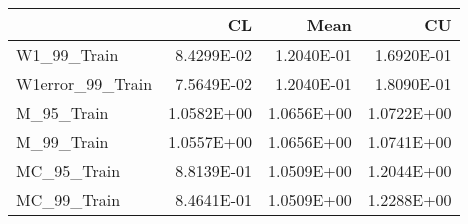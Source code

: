 \begin{tabular}{lrrr}
\toprule
{} &         CL &       Mean &         CU \\
\midrule
W1\_99\_Train      & 8.4299E-02 & 1.2040E-01 & 1.6920E-01 \\
W1error\_99\_Train & 7.5649E-02 & 1.2040E-01 & 1.8090E-01 \\
M\_95\_Train       & 1.0582E+00 & 1.0656E+00 & 1.0722E+00 \\
M\_99\_Train       & 1.0557E+00 & 1.0656E+00 & 1.0741E+00 \\
MC\_95\_Train      & 8.8139E-01 & 1.0509E+00 & 1.2044E+00 \\
MC\_99\_Train      & 8.4641E-01 & 1.0509E+00 & 1.2288E+00 \\
\bottomrule
\end{tabular}
